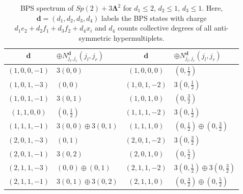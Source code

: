 \begin{table}
	\centering
	\begin{tabular}{|c|C{25ex}||c|C{25ex}|} \hline
		$ \mathbf{d} $ & $ \oplus N_{j_l, j_r}^{\mathbf{d}} (j_l, j_r) $ & $ \mathbf{d} $ & $ \oplus N_{j_l, j_r}^{\mathbf{d}} (j_l, j_r) $ \\ \hline
		$ (1, 0, 0, -1) $ & $ 3(0, 0) $ & $ (1, 0, 0, 0) $ & $ (0, \frac{1}{2}) $ \\ \hline
		$ (1, 0, 1, -3) $ & $ (0, 0) $ & $ (1, 0, 1, -2) $ & $ 3(0, \frac{1}{2}) $ \\ \hline
		$ (1, 0, 1, -1) $ & $ 3(0, 1) $ & $ (1, 0, 1, 0) $ & $ (0, \frac{3}{2}) $ \\ \hline
		$ (1, 1, 0, 0) $ & $ (0, \frac{1}{2}) $ & $ (1, 1, 1, -2) $ & $ 3(0, \frac{1}{2}) $ \\ \hline
		$ (1, 1, 1, -1) $ & $ 3(0, 0) \oplus 3(0, 1) $ & $ (1, 1, 1, 0) $ & $ (0, \frac{1}{2}) \oplus (0, \frac{3}{2}) $ \\ \hline
		$ (2, 0, 1, -3) $ & $ (0, 1) $ & $ (2, 0, 1, -2) $ & $ 3(0, \frac{3}{2}) $ \\ \hline
		$ (2, 0, 1, -1) $ & $ 3(0, 2) $ & $ (2, 0, 1, 0) $ & $ (0, \frac{5}{2}) $ \\ \hline
		$ (2, 1, 1, -3) $ & $ (0, 0) \oplus (0, 1) $ & $ (2, 1, 1, -2) $ & $ 3(0, \frac{1}{2}) \oplus 3(0, \frac{3}{2}) $ \\ \hline
		$ (2, 1, 1, -1) $ & $ 3(0, 1) \oplus 3(0, 2) $ & $ (2, 1, 1, 0) $ & $ (0, \frac{3}{2}) \oplus (0, \frac{5}{2}) $ \\ \hline
	\end{tabular}
	\caption{BPS spectrum of $ Sp(2) + 3\mathbf{\Lambda}^2 $ for $ d_1 \leq 2 $, $ d_2 \leq 1 $, $ d_3 \leq 1 $. Here, $ \mathbf{d} = (d_1, d_2, d_3, d_4) $ labels the BPS states with charge $ d_1 e_2 + d_2 f_1 + d_3 f_2 + d_4 x_i $ and $d_4$ counts collective degrees of all anti-symmetric hypermultiplets.} \label{table:Sp2_3AS}
\end{table}

